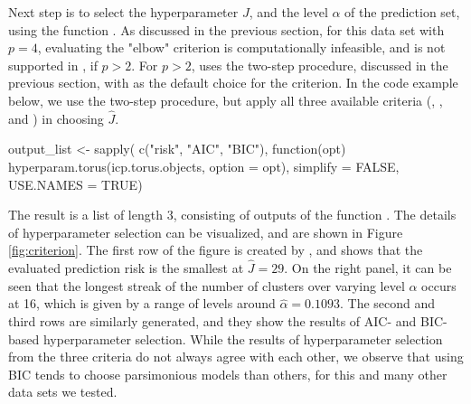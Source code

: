 Next step is to select the hyperparameter $J$, and the level $\alpha$ of the prediction set, using the function . As discussed in the previous section, for this data set with $p = 4$, evaluating the "elbow" criterion is computationally infeasible, and is not supported in , if $p > 2$. 
For $p > 2$,  uses the two-step procedure, discussed in the previous section, with  as the default choice for the criterion. 
In the code example below, we use the two-step procedure, but apply all three available criteria (,  , and ) in choosing $\hat{J}$. 

\begin{example}
output_list <- sapply( c("risk", "AIC", "BIC"), function(opt) {
     hyperparam.torus(icp.torus.objects, option = opt)}, 
     simplify = FALSE,
     USE.NAMES = TRUE)
\end{example}

The result  is a list of length 3, consisting of outputs of the function . The details of hyperparameter selection can be visualized, and are shown in Figure \ref{fig:criterion}. The first row of the figure is created by , and shows that the evaluated prediction risk is the smallest at $\hat{J} = 29$. On the right panel, it can be seen that the longest streak of the number of clusters over varying level $\alpha$ occurs at 16, which is given by a range of levels around $\hat\alpha = 0.1093$. The second and third rows are similarly generated, and they show the results of AIC- and BIC-based hyperparameter selection.
While the results of hyperparameter selection from the three criteria do not always agree with each other, we observe that using BIC tends to choose parsimonious models than others, for this and many other data sets we tested.  

 

